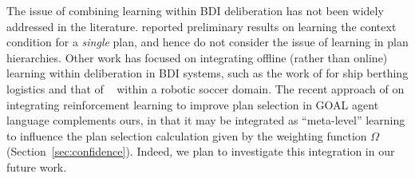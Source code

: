 The issue of combining learning within BDI deliberation has not been widely addressed in the literature.
\citet{hernandez04:learning} reported preliminary results on learning the context condition for a \emph{single} plan, and hence do not consider the issue of learning in plan hierarchies.
Other work has focused on integrating offline (rather than online) learning within deliberation in BDI systems, such as the work of \citet{lokuge07:improving} for ship berthing logistics and that of ~\citet{riedmiller01:karlsruhe} within a robotic soccer domain.
The recent approach of \citet{broekens10:reinforcement} on integrating reinforcement learning to improve plan selection in GOAL agent language complements ours, in that it may be integrated as ``meta-level'' learning to influence the plan selection calculation given by the weighting function $\Omega$ (Section~\ref{sec:confidence}). Indeed, we plan to investigate this integration in our future work.







